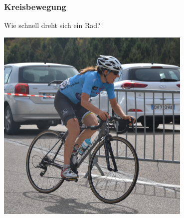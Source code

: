 \documentclass{beamer}
\begin{document}

\begin{frame}
\frametitle{Kreisbewegung}

Wie schnell dreht sich ein Rad?

\begin{center}
\includegraphics[width=0.7\textwidth]{fahrrad.jpg}
\end{center}

\end{frame}
\end{document}
